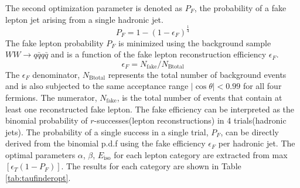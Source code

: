  The second optimization parameter is denoted as $P_F$, the probability of a fake lepton jet arising from a single hadronic jet. 
\begin{equation}
\label{eq:pf}
P_F = 1-(1-\epsilon_F)^{\frac{1}{4}} 
\end{equation} 
 The fake lepton probability $P_F$ is minimized using the background sample $WW\rightarrow q\bar{q}q\bar{q}$ and is a function of the fake lepton reconstruction efficiency $\epsilon_F$.
\begin{equation}
\label{eq:ef}
\epsilon_F = N_{\text{fake}}/N_{\text{Btotal}}
\end{equation}
The $\epsilon_F$ denominator, $N_{\text{Btotal}}$ represents the total number of background events and is also subjected to the same acceptance range $|\cos\theta| < 0.99$ for all four fermions. The numerator, $N_{\text{fake}}$, is the total number of events  that contain at least one reconstructed fake lepton. The fake efficiency can be interpreted as the binomial probability of $r$-successes(lepton reconstructions) in 4 trials(hadronic jets). The probability of a single success in a single trial, $P_F$, can be directly derived from the binomial p.d.f using the fake efficiency $\epsilon_F$ per hadronic jet. 
The optimal parameters $\alpha$, $\beta$, $E_{\text{iso}}$ for each lepton category are extracted from max$[\epsilon_T(1-P_F)]$. The results for each category are shown in Table \ref{tab:taufinderopt}. 

